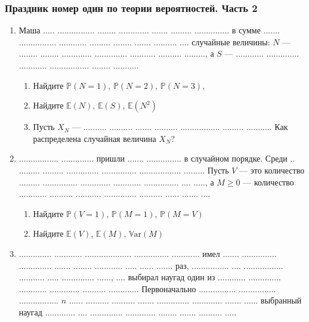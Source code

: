 \documentclass[12pt,a4paper]{article}
\def \P{\mathbb{P}}
\def \Var{\mathbb{V}\mathrm{ar}}
\def \E{\mathbb{E}}
\begin{document}
\thispagestyle{empty}
\subsubsection*{Праздник номер один по теории вероятностей. Часть 2}


\begin{enumerate}
\item Маша ..... ................ ........ ............. ....... ......... ............... в сумме ....... ................ ............ ......... ........ ....... .......... .... случайные величины: $N$ --- ........ ........ ............. .............. ........... .......... ........., а $S$ --- ............ .............. ............ ................. ........ ...........  
\begin{enumerate}
\item Найдите $\P(N=1)$, $\P(N=2)$, $\P(N=3)$, 
\item Найдите $\E(N)$, $\E(S)$, $\E(N^2)$
\item Пусть $X_N$ ---  .......... .......... ....... .......... ................. ......... ........... Как распределена случайная величина $X_N$?
\end{enumerate}


\item ................. ..............  пришли ....... ............... в случайном порядке. Среди .. ......... ......... .............. ...............  .................. ......... Пусть $V$ --- это количество ......... ............... ............. ............ ............... .... ....., а $M\geq 0$ --- количество ............ .......... ........... .............. .......... ...... ....... .... 
\begin{enumerate}
\item Найдите $\P(V=1)$, $\P(M=1)$, $\P(M=V)$
\item Найдите $\E(V)$, $\E(M)$, $\Var(M)$
\end{enumerate}

\item .............. ............ .................... ............... ............ имел ....... ............... .............. ....... ........ ............ ..... ...... ....... раз, ................ .... ................. ........... ..... .............. ......, .... выбирал наугад один из ............ .............. ............ ............. .......... ............. Первоначально ................ ................ .................   $n$ ...... .......... .......... ....... .............. ............. ....... ...... выбранный наугад ............. .... .............. ............. ........ ....... .......... .....


\end{enumerate}
\end{document}
